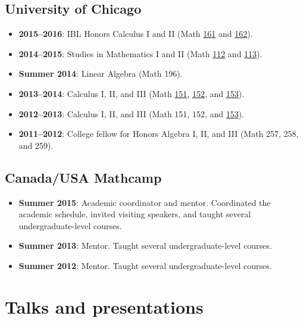 \documentclass[a4paper]{moderncv}
\begin{document}
\subsection*{University of Chicago}
\label{sec:orgbcc984a}
\begin{itemize}
\item \textbf{2015--2016}: IBL Honors Calculus I and II (Math \href{http://www.math.uchicago.edu/\~mcreek/fall\_2015/math\_16100/index.html}{161} and \href{teaching/162win16/}{162}).
\item \textbf{2014--2015}: Studies in Mathematics I and II (Math \href{112aut14/}{112} and \href{113win15/}{113}).
\item \textbf{Summer 2014}: Linear Algebra (Math 196).
\item \textbf{2013--2014}: Calculus I, II, and III (Math \href{}{151}, \href{}{152}, and \href{}{153}).
\item \textbf{2012--2013}: Calculus I, II, and III (Math 151, 152, and \href{}{153}).
\item \textbf{2011--2012}: College fellow for Honors Algebra I, II, and III (Math 257, 258, and 259).
\end{itemize}

\subsection*{Canada/USA Mathcamp}
\label{sec:org9ae9f46}
\begin{itemize}
\item \textbf{Summer 2015}: Academic coordinator and mentor. Coordinated the academic schedule, invited visiting speakers, and taught several undergraduate-level courses.
\item \textbf{Summer 2013}: Mentor. Taught several undergraduate-level courses.
\item \textbf{Summer 2012}: Mentor. Taught several undergraduate-level courses.
\end{itemize}

\section*{Talks and presentations}
\label{sec:org8c1c22f}
\end{document}
